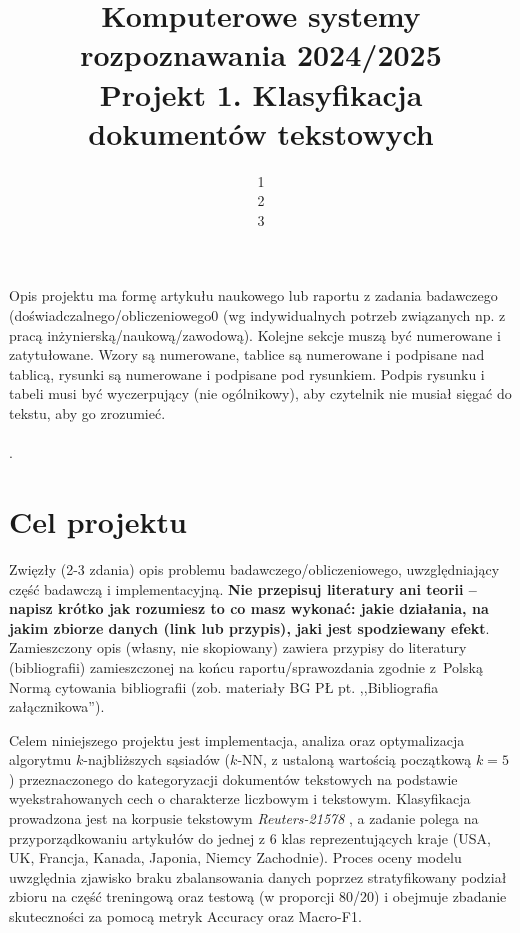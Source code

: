 \documentclass{article}
\author{
	{1}\\
	{2}\\
	{3}
}
\title{Komputerowe systemy rozpoznawania 2024/2025\\Projekt 1. Klasyfikacja dokumentów tekstowych}
\begin{document}
\maketitle

Opis projektu ma formę artykułu naukowego lub raportu z zadania
badawczego (doświadczalnego/obliczeniowego0 (wg indywidualnych potrzeb związanych np. z
pracą inżynierską/naukową/zawodową). Kolejne sekcje muszą być numerowane i
zatytułowane. Wzory są numerowane, tablice są numerowane i podpisane nad
tablicą, rysunki są numerowane i podpisane pod rysunkiem. Podpis rysunku i
tabeli musi być wyczerpujący (nie ogólnikowy), aby czytelnik nie musiał sięgać do tekstu, aby go
zrozumieć.\\
\\
.

\section{Cel projektu}
Zwięzły (2-3 zdania) opis
problemu badawczego/obliczeniowego,  uwzględniający część badawczą i
implementacyjną. {\bf Nie przepisuj literatury ani teorii -- napisz krótko jak
rozumiesz to co masz wykonać: jakie działania, na jakim zbiorze danych (link lub
przypis), jaki jest spodziewany efekt}.\\
\indent Zamieszczony opis (własny, nie skopiowany) zawiera
przypisy do literatury (bibliografii) zamieszczonej na końcu raportu/sprawozdania
zgodnie z~Polską Normą cytowania bibliografii (zob. materiały BG PŁ pt. ,,Bibliografia
załącznikowa'').\\

Celem niniejszego projektu jest implementacja, analiza oraz optymalizacja algorytmu $k$-najbliższych sąsiadów ($k$-NN, z ustaloną wartością początkową $k=5$) przeznaczonego do kategoryzacji dokumentów tekstowych na podstawie wyekstrahowanych cech o charakterze liczbowym i tekstowym.
Klasyfikacja prowadzona jest na korpusie tekstowym \textit{Reuters-21578} \cite{reuters21578}, a zadanie polega na przyporządkowaniu artykułów do jednej z 6 klas reprezentujących kraje (USA, UK, Francja, Kanada, Japonia, Niemcy Zachodnie).
Proces oceny modelu uwzględnia zjawisko braku zbalansowania danych poprzez stratyfikowany podział zbioru na część treningową oraz testową (w proporcji 80/20) i obejmuje zbadanie skuteczności za pomocą metryk Accuracy oraz Macro-F1.
\end{document}
